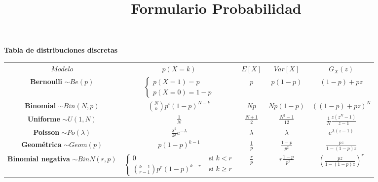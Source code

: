 \documentclass[leqno]{article}
\title{Formulario Probabilidad}
\begin{document}
\maketitle

\textbf{Tabla de distribuciones discretas}
\begin{center}
\begin{tabular}{|c|c|c|c|c|}
\hline
$Modelo$ &  $p(X=k)$ &  $E[X]$ &  $Var[X]$ &  $G_X(z)$ \\
\hline
\makecell{\textbf{Bernoulli}\\ $\sim Be(p)$ }  & $\begin{cases}  p(X=1)=p \\  p(X=0) = 1-p \end{cases}$ & $p$ &  $p(1-p)$ &  $(1-p) + pz$ \\
\hline
\makecell{\textbf{Binomial}\\ $\sim Bin(N, p)$} & $\displaystyle\binom{N}{k}p^i(1-p)^{N-k}$ & $Np$ &  $Np(1-p)$ &  $((1-p)+pz)^N$ \\
\hline
\makecell{\textbf{Uniforme} \\ $\sim U(1, N)$} &  $\displaystyle\frac{1}{N}$ & $\displaystyle\frac{N+1}{2}$ & $\displaystyle\frac{N^2-1}{12}$ & $\displaystyle\frac{1}{N} \frac{z(z^N-1)}{z-1}$ \\
\hline
\makecell{\textbf{Poisson} \\ $\sim Po(\lambda)$} & $\displaystyle\frac{\lambda^k}{k!}e^{-\lambda}$ & $\lambda$ & $\lambda$ & $\displaystyle e^{\lambda(z-1)}$ \\
\hline
\makecell{\textbf{Geométrica} \\ $\sim Geom(p)$} & $\displaystyle p(1-p)^{k-1}$ &  $\displaystyle\frac{1}{p}$ &  $\displaystyle\frac{1-p}{p^2}$ &  $\displaystyle \frac{pz}{1-(1-p)z}$ \\
\hline
\makecell{\textbf{Binomial negativa} \\ $\sim BinN(r, p)$} & $\begin{cases} 0 & \text{ si } k<r \\ \binom{k-1}{r-1}p^r(1-p)^{k-r} & \text{ si } k\ge r \end{cases}$ & $\displaystyle\frac{r}{p}$ & $\displaystyle r \frac{1-p}{p^2}$ & $\displaystyle \left( \frac{pz}{1-(1-p)z} \right)^r $ \\
\hline
\end{tabular}
\end{center}
\end{document}
